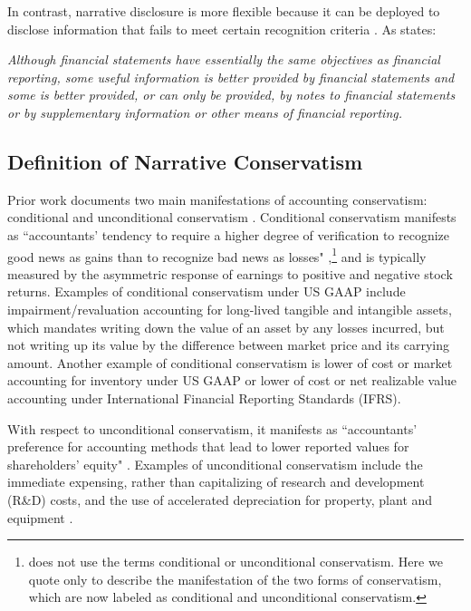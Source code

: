\documentclass[letterpaper,12pt]{article}
\begin{document}
\begin{spacing}{1.5}
In contrast, narrative disclosure is more flexible because it can be deployed to disclose information that fails to meet certain recognition criteria \cite[par. 7b]{fasbStatementFinancialAccounting1984}. As  states:
\begin{adjustwidth}{1cm}{1cm}
	\begin{singlespace}
		\textit{Although financial statements have essentially the same objectives as financial reporting, some useful information is better provided by financial statements and some is better provided, or can only be provided, by notes to financial statements or by supplementary information or other means of financial reporting.}
	\end{singlespace}
\end{adjustwidth}

\subsection{Definition of Narrative Conservatism}\label{sec2.1}
\noindent Prior work documents two main manifestations of accounting conservatism: conditional and unconditional conservatism \cite{beaverConditionalUnconditionalConservatism2005}. Conditional conservatism manifests as ``accountants' tendency to require a higher degree of verification to recognize good news as gains than to recognize bad news as losses" \cite[p. 7]{basuConservatismPrincipleAsymmetric1997},\footnote{ does not use the terms conditional or unconditional conservatism. Here we quote  only to describe the manifestation of the two forms of conservatism, which are now labeled as conditional and unconditional conservatism.} and is typically measured by the asymmetric response of earnings to positive and negative stock returns. Examples of conditional conservatism under US GAAP include impairment/revaluation accounting for long-lived tangible and intangible assets, which mandates writing down the value of an asset by any losses incurred, but not writing up its value by the difference between market price and its carrying amount. Another example of conditional conservatism is lower of cost or market accounting for inventory under US GAAP or lower of cost or net realizable value accounting under International Financial Reporting Standards (IFRS). 

With respect to unconditional conservatism, it manifests as ``accountants' preference for accounting methods that lead to lower reported values for shareholders' equity" \cite[p. 8]{basuConservatismPrincipleAsymmetric1997}. Examples of unconditional conservatism include the immediate expensing, rather than capitalizing of research and development (R\&D) costs, and the use of accelerated depreciation for property, plant and equipment \cite{beaverConditionalUnconditionalConservatism2005}. 


\end{spacing}
\end{document}
